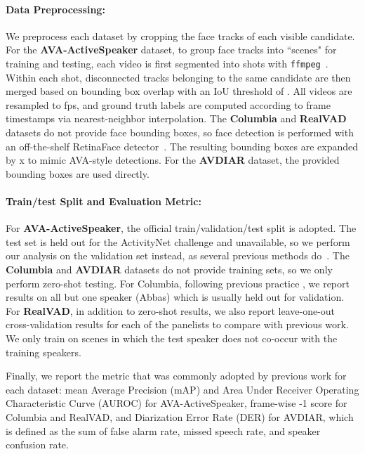 \documentclass[sigconf]{acmart}
\begin{document}
\begin{CCSXML}
\paragraph{Data Preprocessing:} We preprocess each dataset by cropping the face tracks of each visible candidate. For the \textbf{AVA-ActiveSpeaker} dataset, to group face tracks into ``scenes" for training and testing, each video is first segmented into shots with \texttt{ffmpeg}~\cite{DBLP:journals/ijig/Lienhart01}. Within each shot, disconnected tracks belonging to the same candidate are then merged based on bounding box overlap with an IoU threshold of . All videos are resampled to fps, and ground truth labels are computed according to frame timestamps via nearest-neighbor interpolation. The \textbf{Columbia} and \textbf{RealVAD} datasets do not provide face bounding boxes, so face detection is performed with an off-the-shelf RetinaFace detector~\cite{DBLP:conf/cvpr/DengGVKZ20}. The resulting bounding boxes are expanded by x to mimic AVA-style detections. For the \textbf{AVDIAR} dataset, the provided bounding boxes are used directly.
\vspace{-1.5ex}
\paragraph{Train/test Split and Evaluation Metric:}
For \textbf{AVA-ActiveSpeaker}, the official train/validation/test split is adopted. The test set is held out for the ActivityNet challenge and unavailable, so we perform our analysis on the validation set instead, as several previous methods do~\cite{DBLP:conf/cvpr/AlcazarCMPLAG20,zhangmulti2019,DBLP:journals/corr/abs-1906-10555}. The \textbf{Columbia} and \textbf{AVDIAR} datasets do not provide training sets, so we only perform zero-shot testing. For Columbia, following previous practice \cite{DBLP:conf/eccv/ChakravartyT16,DBLP:conf/accv/ChungZ16a}, we report results on all but one speaker (Abbas) which is usually held out for validation. For \textbf{RealVAD}, in addition to zero-shot results, we also report leave-one-out cross-validation results for each of the  panelists to compare with previous work. We only train on scenes in which the test speaker does not co-occur with the training speakers. 


Finally, we report the metric that was commonly adopted by previous work for each dataset: mean Average Precision (mAP) and Area Under Receiver Operating Characteristic Curve (AUROC) for AVA-ActiveSpeaker, frame-wise -1 score for Columbia and RealVAD, and Diarization Error Rate (DER) for AVDIAR, which is defined as the sum of false alarm rate, missed speech rate, and speaker confusion rate.
\vspace{-2ex}

\end{CCSXML}
\end{document}
